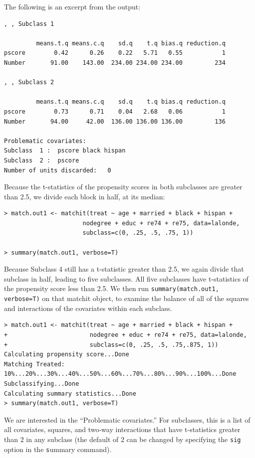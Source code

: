 \documentclass[oneside,letterpaper,titlepage]{article}
\begin{document}
The following is an excerpt from the output:

\begin{verbatim}
, , Subclass 1

         means.t.q means.c.q    sd.q    t.q bias.q reduction.q
pscore        0.42      0.26    0.22   5.71   0.55           1
Number       91.00    143.00  234.00 234.00 234.00         234

, , Subclass 2

         means.t.q means.c.q    sd.q    t.q bias.q reduction.q
pscore        0.73      0.71    0.04   2.68   0.06           1
Number       94.00     42.00  136.00 136.00 136.00         136

Problematic covariates:
Subclass  1 :  pscore black hispan
Subclass  2 :  pscore
Number of units discarded:   0

\end{verbatim}

Because the t-statistics of the propensity scores in both subclasses
are greater than 2.5, we divide each block in half, at its median:

\begin{verbatim}
> match.out1 <- matchit(treat ~ age + married + black + hispan +
                      nodegree + educ + re74 + re75, data=lalonde,                      
                      subclass=c(0, .25, .5, .75, 1))

> summary(match.out1, verbose=T)
\end{verbatim}

Because Subclass 4 still has a t-statistic greater than 2.5, we again
divide that subclass in half, leading to five subclasses.  All five
subclasses have t-statistics of the propensity score less than 2.5.
We then run {\tt summary(match.out1, verbose=T)} on that matchit
object, to examine the balance of all of the squares and interactions
of the covariates within each subclass.

\begin{verbatim}
> match.out1 <- matchit(treat ~ age + married + black + hispan +
+                       nodegree + educ + re74 + re75, data=lalonde,
+                       subclass=c(0, .25, .5, .75,.875, 1))
Calculating propensity score...Done
Matching Treated: 10%...20%...30%...40%...50%...60%...70%...80%...90%...100%...Done
Subclassifying...Done
Calculating summary statistics...Done
> summary(match.out1, verbose=T)
\end{verbatim}

We are interested in the ``Problematic covariates.''  For subclasses,
this is a list of all covariates, squares, and two-way interactions
that have t-statistics greater than $2$ in any subclass (the default
of $2$ can be changed by specifying the \texttt{sig} option in the
{\texttt summary} command).
\end{document}
